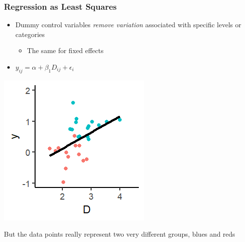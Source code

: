 \documentclass[xcolor=x11names,compress]{beamer}\usepackage[]{graphicx}\usepackage[]{color}
\makeatletter
\def\maxwidth{ %
  \ifdim\Gin@nat@width>\linewidth
    \linewidth
  \else
    \Gin@nat@width
  \fi
}
\newenvironment{knitrout}{}{} %
\renewcommand{\(}{\begin{columns}}
\renewcommand{\)}{\end{columns}}
\newcommand{\<}[1]{\begin{column}{#1}}
\renewcommand{\>}{\end{column}}
\makeatother
\begin{document}
\begin{frame}
\frametitle{Regression as Least Squares}
\begin{itemize}
\item Dummy control variables \textit{remove variation} associated with specific levels or categories
\begin{itemize}
\item The same for fixed effects
\end{itemize}
\item $y_{ij} = \alpha + \beta_1 D_{ij} + \epsilon_i$
\end{itemize}
\begin{multicols}{2}
\begin{knitrout}
\color{fgcolor}
\includegraphics[width=\maxwidth]{figure/graph_ols_FE2-1} 

\end{knitrout}
\columnbreak
But the data points really represent two very different groups, blues and reds
\end{multicols}
\end{frame}
\end{document}
